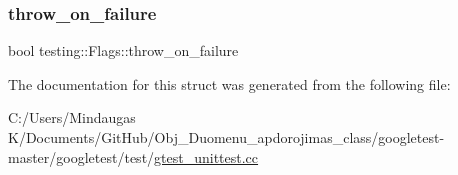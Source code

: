 \mbox{\label{structtesting_1_1_flags_ab8e7d21e31e641efe47b8050759e001a}} 
\subsubsection{\texorpdfstring{throw\_on\_failure}{throw\_on\_failure}}
{\footnotesize\ttfamily bool testing\+::\+Flags\+::throw\+\_\+on\+\_\+failure}



The documentation for this struct was generated from the following file\+:\begin{DoxyCompactItemize}
\item 
C\+:/\+Users/\+Mindaugas K/\+Documents/\+Git\+Hub/\+Obj\+\_\+\+Duomenu\+\_\+apdorojimas\+\_\+class/googletest-\/master/googletest/test/\mbox{\hyperlink{googletest-master_2googletest_2test_2gtest__unittest_8cc}{gtest\+\_\+unittest.\+cc}}\end{DoxyCompactItemize}
